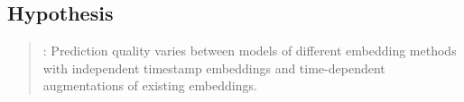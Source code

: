 \addtocounter{hcounter}{1}
\subsection{Hypothesis \thehcounter} %
\label{sec:hypothesis_\thehcounter}

\begin{quote}
:
Prediction quality varies between models of different embedding methods with independent timestamp embeddings and time-dependent augmentations of existing embeddings.
\end{quote}
